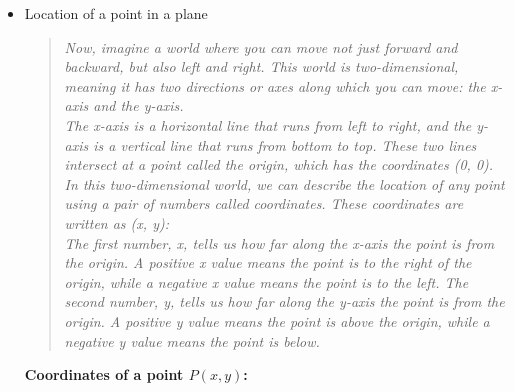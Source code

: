 \begin{itemize}
    \item Location of a point in a plane
    \begin{quote}
        \textit{
            Now, imagine a world where you can move not just forward and backward, but also left and right. This world is two-dimensional, meaning it has two directions or axes along which you can move: the x-axis and the y-axis.\\[2mm]
            The x-axis is a horizontal line that runs from left to right, and the y-axis is a vertical line that runs from bottom to top. These two lines intersect at a point called the origin, which has the coordinates (0, 0).
            In this two-dimensional world, we can describe the location of any point using a pair of numbers called coordinates. These coordinates are written as (x, y):\\[2mm]
            The first number, x, tells us how far along the x-axis the point is from the origin. A positive x value means the point is to the right of the origin, while a negative x value means the point is to the left.
            The second number, y, tells us how far along the y-axis the point is from the origin. A positive y value means the point is above the origin, while a negative y value means the point is below.
        }
    \end{quote}

        \begin{center}
        \end{center}

        \textbf{Coordinates of a point $P(x, y)$:} \\
        

\end{itemize}
